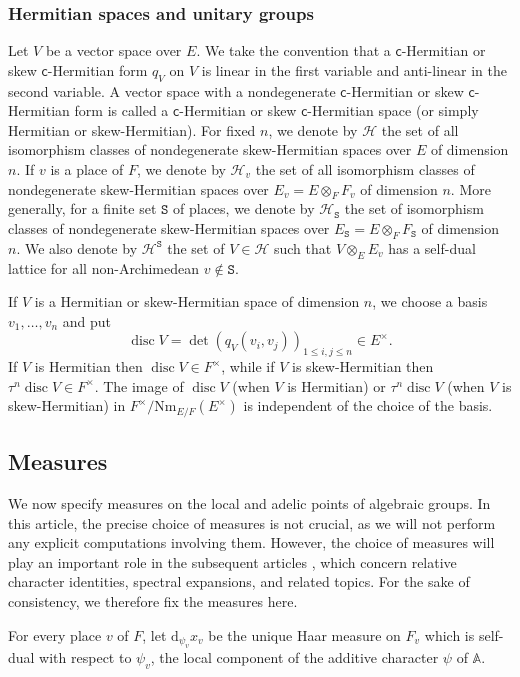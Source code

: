 \documentclass[letterpaper,11pt]{amsart}
\newcommand{\bA}{\mathbb{A}}
\newcommand{\cH}{\mathcal{H}}
\newcommand{\rd}{\mathrm{d}}
\newcommand{\sfc}{\mathsf{c}}
\newcommand{\tS}{\mathtt{S}}
\newcommand{\<}{\negthickspace}
\DeclareMathOperator{\disc}{disc}
\theoremstyle{definition}
\theoremstyle{plain}
\theoremstyle{remark}
\numberwithin{equation}{section}
\begin{document}
\subsubsection{Hermitian spaces and unitary groups}
Let $V$ be a vector space over $E$. We take the convention that a $\sfc$-Hermitian
or skew $\sfc$-Hermitian form $q_V$ on $V$ is linear in the first variable and anti-linear
in the second variable. A vector space with a nondegenerate $\sfc$-Hermitian or
skew $\sfc$-Hermitian form is called a $\sfc$-Hermitian or skew $\sfc$-Hermitian space (or simply Hermitian or skew-Hermitian). For fixed $n$, we denote by $\cH$ the set of all isomorphism classes of nondegenerate
skew-Hermitian spaces over $E$ of dimension $n$. If $v$ is a place of $F$, we denote by $\cH_v$ the set of all isomorphism classes of nondegenerate
skew-Hermitian spaces over $E_v = E \otimes_F F_v$ of dimension $n$. More generally, for a finite set $\tS$ of places, we denote by $\cH_{\tS}$ the set of isomorphism classes of nondegenerate
skew-Hermitian spaces over $E_\tS = E \otimes_F F_{\tS}$ of dimension $n$. We also denote by $\cH^{\tS}$ the set of $V \in \cH$ such that $V \otimes_{E} E_v$ has a self-dual lattice for all non-Archimedean $v \not \in \tS$.

If $V$ is a Hermitian or skew-Hermitian space of dimension $n$, we choose a basis $v_1,
\hdots, v_n$ and put
    \[
    \disc V = \det (q_V(v_i, v_j))_{1 \leq i, j \leq n} \in E^\times.
    \]
If $V$ is Hermitian then $\disc V \in F^\times$, while if $V$ is
skew-Hermitian then $\tau^n \disc V \in F^\times$. The image of $\disc V$
(when $V$ is Hermitian) or $\tau^n \disc V$ (when $V$ is skew-Hermitian) in
$F^\times /\mathrm{Nm}_{E/F}(E^\times)$ is independent of the choice of the basis.

\subsection{Measures}    \label{subsubsec:measures}

We now specify measures on the local and adelic points of algebraic groups. In this article, the precise choice of measures is not crucial, as we will not perform any explicit computations involving them. However, the choice of measures will play an important role in the subsequent articles \cite{BLX2, BLX3}, which concern relative character identities, spectral expansions, and related topics. For the sake of consistency, we therefore fix the measures here. 

For every place $v$ of $F$, let $\rd_{\psi_v} x_v$ be the unique Haar measure on $F_v$ which is self-dual with respect to $\psi_v$, the local component of the additive character $\psi$ of $\bA$.
\end{document}
